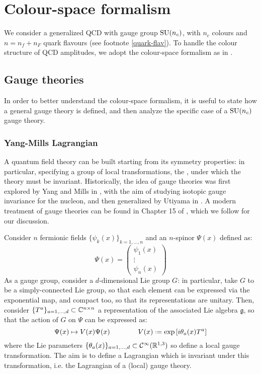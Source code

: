 \section{Colour-space formalism}
\label{sec:colour-space}

We consider a generalized QCD with gauge group $ \mathrm{SU}(n_c) $, with $ n_c $ colours and $ n = n_f + n_F $ quark flavours (see footnote \ref{quark-flav}). To handle the colour structure of QCD amplitudes, we adopt the colour-space formalism as in \cite{Catani-1997}.

\subsection{Gauge theories}
\label{ssec:gauge-th}

In order to better understand the colour-space formalism, it is useful to state how a general gauge theory is defined, and then analyze the specific case of a $ \mathrm{SU}(n_c) $ gauge theory.

\subsubsection{Yang-Mills Lagrangian}

A quantum field theory can be built starting from its symmetry properties: in particular, specifying a group of local transformations, the , under which the theory must be invariant. Historically, the idea of gauge theories was first explored by Yang and Mills in \cite{Yang-1954}, with the aim of studying isotopic gauge invariance for the nucleon, and then generalized by Utiyama in \cite{Utiyama-1956}. A modern treatment of gauge theories can be found in Chapter 15 of \cite{Peskin-1995}, which we follow for our discussion.

Consider $ n $ fermionic fields $ \{\psi_k(x)\}_{k = 1, \dots, n} $ and an $ n $-spinor $ \Psi(x) $ defined as:
\begin{equation}
  \Psi(x) =
  \begin{pmatrix}
    \psi_1(x) \\ \vdots \\ \psi_n(x)
  \end{pmatrix}
\end{equation}
As a gauge group, consider a $ d $-dimensional Lie group $ G $: in particular, take $ G $ to be a simply-connected Lie group, so that each element can be expressed via the exponential map, and compact too, so that its representations are unitary. Then, consider $ \{T^a\}_{a = 1, \dots, d} \subset \mathbb{C}^{n \times n} $ a representation of the associated Lie algebra $ \mathfrak{g} $, so that the action of $ G $ on $ \Psi $ can be expressed as:
\begin{equation}
  \Psi(x) \mapsto V(x) \Psi(x)
  \qquad \qquad
  V(x) \defeq \exp \left[ i \theta_a(x) T^a \right]
  \label{eq:gauge-trans}
\end{equation}
where the Lie parameters $ \{\theta_a(x)\}_{a = 1, \dots, d} \subset \mathcal{C}^\infty(\mathbb{R}^{1,3}) $ so define a local gauge transformation. The aim is to define a Lagrangian which is invariant under this transformation, i.e. the Lagrangian of a (local) gauge theory.

